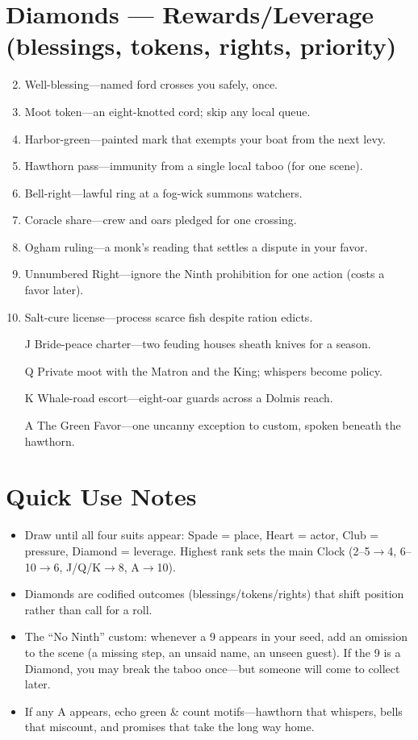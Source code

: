 \section*{Diamonds --- Rewards/Leverage (blessings, tokens, rights, priority)}
\begin{enumerate}
\setcounter{enumi}{1}
\item Well-blessing---named ford crosses you safely, once.
\item Moot token---an eight-knotted cord; skip any local queue.
\item Harbor-green---painted mark that exempts your boat from the next levy.
\item Hawthorn pass---immunity from a single local taboo (for one scene).
\item Bell-right---lawful ring at a fog-wick summons watchers.
\item Coracle share---crew and oars pledged for one crossing.
\item Ogham ruling---a monk's reading that settles a dispute in your favor.
\item Unnumbered Right---ignore the Ninth prohibition for one action (costs a favor later).
\item Salt-cure license---process scarce fish despite ration edicts.
\item[J] Bride-peace charter---two feuding houses sheath knives for a season.
\item[Q] Private moot with the Matron and the King; whispers become policy.
\item[K] Whale-road escort---eight-oar guards across a Dolmis reach.
\item[A] The Green Favor---one uncanny exception to custom, spoken beneath the hawthorn.
\end{enumerate}

\section*{Quick Use Notes}
\begin{itemize}
\item Draw until all four suits appear: Spade = place, Heart = actor, Club = pressure, Diamond = leverage. Highest rank sets the main Clock (2--5$\rightarrow$4, 6--10$\rightarrow$6, J/Q/K$\rightarrow$8, A$\rightarrow$10).
\item Diamonds are codified outcomes (blessings/tokens/rights) that shift position rather than call for a roll.
\item The ``No Ninth'' custom: whenever a 9 appears in your seed, add an omission to the scene (a missing step, an unsaid name, an unseen guest). If the 9 is a Diamond, you may break the taboo once---but someone will come to collect later.
\item If any A appears, echo green \& count motifs---hawthorn that whispers, bells that miscount, and promises that take the long way home.
\end{itemize}

